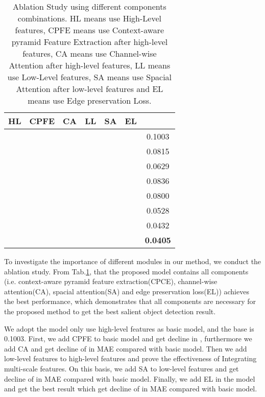 \documentclass[10pt,twocolumn,letterpaper]{article}
\begin{document}
\begin{table}[h]
\begin{center}
\begin{tabular}{| c c c c c c | c |}
\hline
HL & CPFE & CA & LL & SA & EL &   \\ \hline\hline
&     &    &    &    &    &    0.1003   \\
&&    &    &    &    & 0.0815 \\
&&  &    &    &    &  0.0629 \\
&     &    &&    &    &  0.0836  \\
&     &    &&    &&  0.0800     \\
&&&&    &    &  0.0528    \\
&&&&&    &  0.0432     \\
&&&&&&  \textbf{0.0405}     \\

\hline
\end{tabular}
\end{center}
\caption{Ablation Study using different components combinations. HL means use High-Level features, CPFE means use Context-aware pyramid Feature Extraction after high-level features, CA means use Channel-wise Attention after high-level features, LL means use Low-Level features, SA means use Spacial Attention after low-level features and EL means use Edge preservation Loss.}
\label{tab:ablation}
\end{table}


To investigate the importance of different modules in our method, we conduct the ablation study. From Tab.\ref{tab:ablation}, that the proposed model contains all components (i.e. context-aware pyramid feature extraction(CPCE), channel-wise attention(CA), spacial attention(SA) and edge preservation loss(EL)) achieves the best performance, which demonstrates that all components are necessary for the proposed method to get the best salient object detection result.

We adopt the model only use high-level features as basic model, and the base  is 0.1003. First, we add CPFE to basic model and get decline in , furthermore we add CA and get decline of  in MAE compared with basic model. Then we add low-level features to high-level features and prove the effectiveness of Integrating multi-scale features. On this basis, we add SA to low-level features and get decline of  in MAE compared with basic model. Finally, we add EL in the model and get the best result which get decline of  in MAE compared with basic model. 
\end{document}
